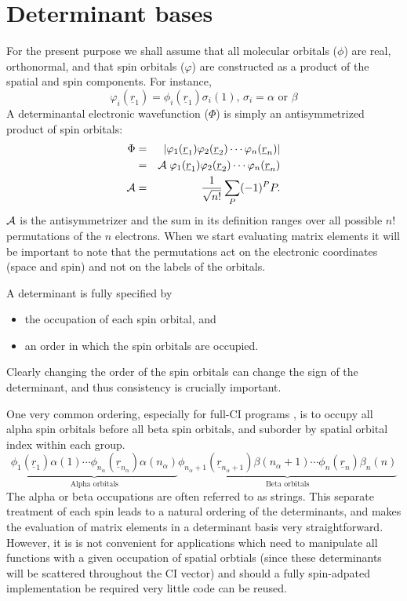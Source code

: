 \documentclass[fullpage,12pt,fleqn]{article}
\newcommand{\RNold}[1]{\underline{r}_{#1}}
\begin{document}
\section{Determinant bases}

 For the present purpose we shall assume that all molecular orbitals
($\phi$) are real, orthonormal, and that spin orbitals ($\varphi$) are
constructed as a product of the spatial and spin components.  For
instance,
\begin{equation}
 \varphi_{i}(\RNold{1}) = \phi_i(\RNold{1}) \sigma_i(1)
\mbox{, $\sigma_i = \alpha$ or $\beta$}
\end{equation}
A determinantal electronic wavefunction ($\Phi$) is simply an
antisymmetrized product of spin orbitals:
\begin{eqnarray}
  \Phi & = & \left| \varphi_{1}(\RNold{1}) \varphi_{2}(\RNold{2}) \cdots
\varphi_{n}(\RNold{n}) \right | \\
       & = & {\cal A} \; \varphi_{1}(\RNold{1}) \varphi_{2}(\RNold{2}) \cdots
\varphi_{n}(\RNold{n}) \\
{\cal A} & = & \frac{1}{\sqrt{n!}} \sum_{P} (-1)^P P.
\end{eqnarray}
${\cal A}$ is the antisymmetrizer and the sum in its definition ranges
over all possible $n!$ permutations of the $n$ electrons.  When we
start evaluating matrix elements it will be important to note that the
permutations act on the electronic coordinates (space and spin) and
not on the labels of the orbitals.  

A determinant is fully specified by
\begin{itemize}
\item the occupation of each spin orbital, and
\item an order in which the spin orbitals are occupied.
\end{itemize}
Clearly changing the order of the spin orbitals can change the sign of
the determinant, and thus consistency is crucially important. 

One very common ordering, especially for full-CI programs
\cite{handyfci}, is to occupy all alpha spin orbitals before all beta spin
orbitals, and suborder by spatial orbital index within each group.
\begin{equation}
\underbrace{\phi_{1}(\RNold{1})\alpha(1) \cdots
\phi_{n_{\alpha}}(\RNold{n_{\alpha}})\alpha(n_{\alpha})}_{\mbox{Alpha orbitals}}
\underbrace{\phi_{n_{\alpha}+1}(\RNold{n_{\alpha}+1})\beta(n_{\alpha}+1) \cdots 
\phi_{n}(\RNold{n})\beta_{n}(n)}_{\mbox{Beta orbitals}}
\end{equation}
The alpha or beta occupations are often referred to as strings.  This
separate treatment of each spin leads to a natural ordering of the
determinants, and makes the evaluation of matrix elements in a
determinant basis very straightforward.  However, it is is not
convenient for applications which need to manipulate all functions
with a given occupation of spatial orbtials (since these determinants
will be scattered throughout the CI vector) and should a fully
spin-adpated implementation be required very little code can be
reused.  
\end{document}
